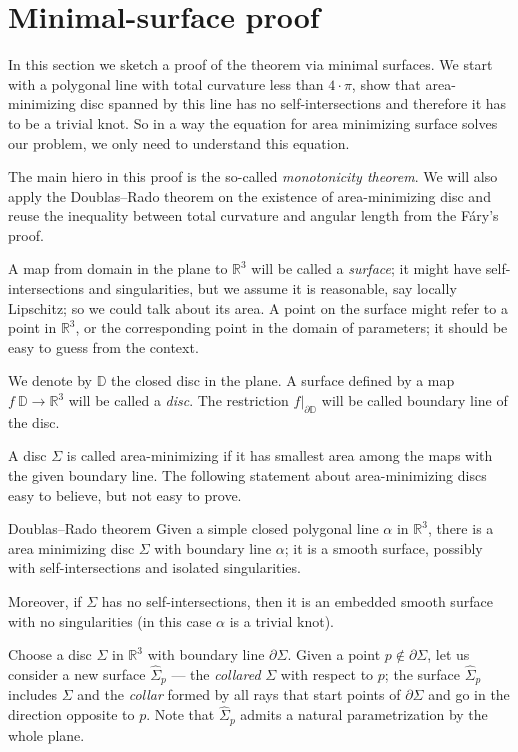  \section{Minimal-surface proof}

In this section we sketch a proof of the theorem via minimal surfaces.
We start with a polygonal line with total curvature less than $4\cdot\pi$, show that area-minimizing disc spanned by this line has no self-intersections and therefore it has to be a trivial knot.
So in a way the equation for area minimizing surface solves our problem, we only need to understand this equation.

The main hiero in this proof is the so-called \emph{monotonicity theorem}.
We will also apply the Doublas--Rado theorem on the existence of area-minimizing disc and reuse the inequality between total curvature and angular length from the F\'ary's proof.

A map from domain in the plane to $\mathbb{R}^3$ will be called a \emph{surface};
it might have self-intersections and singularities, but we assume it is reasonable, say locally Lipschitz; so we could talk about its area.
A point on the surface might refer to a point in $\mathbb{R}^3$, or the corresponding point in the domain of parameters;
it should be easy to guess from the context.

We denote by $\mathbb{D}$ the closed disc in the plane.
A surface defined by a map $f\:\mathbb{D}\to\mathbb{R}^3$ will be called a \emph{disc}.
The restriction $f|_{\partial \mathbb{D}}$ will be called boundary line of the disc.

A disc $\Sigma$ is called area-minimizing if it has smallest area among the maps with the given boundary line.
The following statement about area-minimizing discs easy to believe, but not easy to prove. %

\begin{thm}{Doublas--Rado theorem}\label{thm:min-exists}
Given a simple closed polygonal line $\alpha$ in $\mathbb{R}^3$, there is a area minimizing disc $\Sigma$ with boundary line $\alpha$; it is a smooth surface, possibly with self-intersections and isolated singularities.

Moreover, if $\Sigma$ has no self-intersections, then it is an embedded smooth surface with no singularities (in this case $\alpha$ is a trivial knot).
\end{thm}

Choose a disc $\Sigma$ in $\mathbb{R}^3$ with boundary line $\partial\Sigma$.
Given a point $p\notin \partial\Sigma$, let us consider a new surface $\hat\Sigma_p$ --- the \emph{collared} $\Sigma$ with respect to $p$;
the surface $\hat\Sigma_p$ includes $\Sigma$ and the \emph{collar} formed by all rays that start points of $\partial\Sigma$ and go in the direction opposite to $p$.
Note that $\hat\Sigma_p$ admits a natural parametrization by the whole plane.

